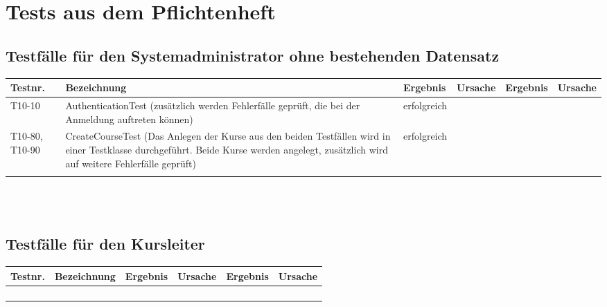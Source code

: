 \chapter{Tests aus dem Pflichtenheft}

\begin{landscape}
	\section{Testfälle für den Systemadministrator ohne bestehenden Datensatz}	
		\begin{tabular}{|p{2.0cm} |p{5.0cm}|p{3.0cm}|p{5.0cm}|p{4.0cm}|p{4.0cm}|}
			\hline \textbf{Testnr.} & \textbf{Bezeichnung} & \textbf{Ergebnis} & \textbf{Ursache} & \textbf{Ergebnis} & \textbf{Ursache} \\ 
      	    \hline    T10-10   &      AuthenticationTest (zusätzlich werden Fehlerfälle geprüft, die bei der Anmeldung auftreten können)   &  erfolgreich &                  &                   &                  \\ 
			
			\hline T10-80, T10-90   &      CreateCourseTest  (Das Anlegen der Kurse aus den beiden Testfällen wird in einer Testklasse durchgeführt. Beide Kurse werden angelegt, zusätzlich wird auf weitere Fehlerfälle geprüft)              &      erfolgreich             &                  &                   &                  \\ 
			\hline       &          &          &        &         &       \\
			\hline 
		\end{tabular} \ \\
		\ \\
	\section{Testfälle für den Kursleiter}
		\begin{tabular}{|p{2.0cm} |p{5.0cm}|p{3.0cm}|p{5.0cm}|p{4.0cm}|p{4.0cm}|}
			\hline \textbf{Testnr.} & \textbf{Bezeichnung} & \textbf{Ergebnis} & \textbf{Ursache} & \textbf{Ergebnis} & \textbf{Ursache} \\
			\hline       &          &          &        &         &       \\
			\hline       &          &          &        &         &       \\
			\hline       &          &          &        &         &       \\
			\hline       &          &          &        &         &       \\
			\hline 
		\end{tabular} \ \\
		\ \\
				

\end{landscape}
